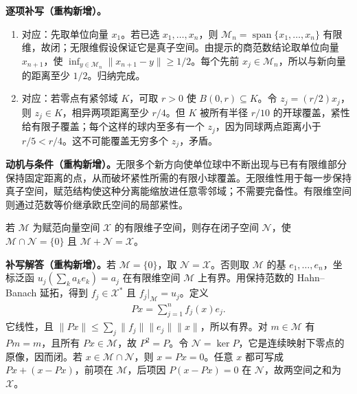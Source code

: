 \documentclass[../../main.tex]{subfiles}
\begin{document}
\begin{solution}
\textbf{逐项补写（重构新增）。}
\begin{enumerate}
\item 对应：先取单位向量 $x_1$。若已选 $x_1,\ldots,x_n$，则 $\mathcal M_n=\operatorname{span}\{x_1,\ldots,x_n\}$ 有限维，故闭；无限维假设保证它是真子空间。由提示的商范数结论取单位向量 $x_{n+1}$，使 $\inf_{y\in\mathcal M_n}\|x_{n+1}-y\|\ge1/2$。每个先前 $x_j\in\mathcal M_n$，所以与新向量的距离至少 $1/2$。归纳完成。
\item 对应：若零点有紧邻域 $K$，可取 $r>0$ 使 $B(0,r)\subseteq K$。令 $z_j=(r/2)x_j$，则 $z_j\in K$，相异两项距离至少 $r/4$。但 $K$ 被所有半径 $r/10$ 的开球覆盖，紧性给有限子覆盖；每个这样的球内至多有一个 $z_j$，因为同球两点距离小于 $r/5<r/4$。这不可能覆盖无穷多个 $z_j$，矛盾。
\end{enumerate}
\end{solution}
\begin{remark}
\textbf{动机与条件（重构新增）。}无限多个新方向使单位球中不断出现与已有有限维部分保持固定距离的点，从而破坏紧性所需的有限小球覆盖。无限维性用于每一步保持真子空间，赋范结构使这种分离能缩放进任意零邻域；不需要完备性。有限维空间则通过范数等价继承欧氏空间的局部紧性。
\end{remark}
\begin{exercise}\label{exercise:ch05-finite-dimensional-complement}
若 $\mathcal M$ 为赋范向量空间 $\mathcal X$ 的有限维子空间，则存在闭子空间 $\mathcal N$，使 $\mathcal M\cap\mathcal N=\{0\}$ 且 $\mathcal M+\mathcal N=\mathcal X$。
\end{exercise}
\begin{solution}
\textbf{补写解答（重构新增）。}若 $\mathcal M=\{0\}$，取 $\mathcal N=\mathcal X$。否则取 $\mathcal M$ 的基 $e_1,\ldots,e_n$，坐标泛函 $u_j(\sum_k a_ke_k)=a_j$ 在有限维空间 $\mathcal M$ 上有界。用保持范数的 Hahn--Banach 延拓，得到 $f_j\in\mathcal X^*$ 且 $f_j|_{\mathcal M}=u_j$。定义
\begin{align*}
Px=\sum_{j=1}^nf_j(x)e_j.
\end{align*}
它线性，且 $\|Px\|\le\sum_j\|f_j\|\|e_j\|\|x\|$，所以有界。对 $m\in\mathcal M$ 有 $Pm=m$，且所有 $Px\in\mathcal M$，故 $P^2=P$。令 $\mathcal N=\ker P$，它是连续映射下零点的原像，因而闭。若 $x\in\mathcal M\cap\mathcal N$，则 $x=Px=0$。任意 $x$ 都可写成 $Px+(x-Px)$，前项在 $\mathcal M$，后项因 $P(x-Px)=0$ 在 $\mathcal N$，故两空间之和为 $\mathcal X$。
\end{solution}
\end{document}
